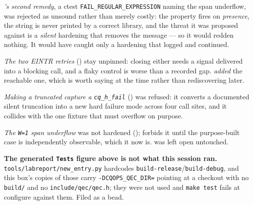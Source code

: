 \begin{figures}
\end{figures}

\emph{'s second remedy}, a ctest \texttt{FAIL\_REGULAR\_EXPRESSION} naming the span
underflow, was rejected as unsound rather than merely costly: the property fires on
\emph{presence}, the string is never printed by a correct library, and the threat it was
proposed against is a \emph{silent} hardening that removes the message --- so it would redden
nothing. It would have caught only a hardening that logged and continued.

\emph{The two EINTR retries} () stay unpinned: closing either needs a signal delivered
into a blocking call, and a flaky control is worse than a recorded gap.  \emph{added}
the reachable one, which is worth saying at the time rather than rediscovering later.

\emph{Making a truncated capture a \texttt{cq\_h\_fail}} () was refused: it converts a
documented silent truncation into a new hard failure mode across four call sites, and it
collides with the one fixture that must overflow on purpose.

\emph{The \texttt{W=1} span underflow} was not hardened ();  forbids it until
the purpose-built case is independently observable, which it now is. \emph{} was left
open untouched.

\textbf{The generated \texttt{Tests} figure above is not what this session ran.}
\texttt{tools/labreport/new\_entry.py} hardcodes \texttt{build-release}/\texttt{build-debug},
and this box's copies of those carry \texttt{-DCQOPS\_QEC\_DIR=} pointing at a checkout with no
\texttt{build/} and no \texttt{include/qec/qec.h}; they were not used and \texttt{make test}
fails at configure against them. Filed as a bead.

